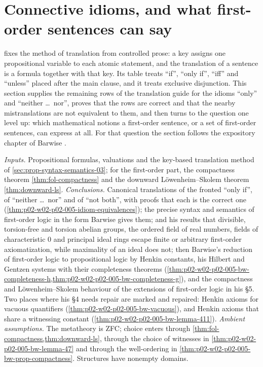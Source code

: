 \section{Connective idioms, and what first-order sentences can say}
\label{sec:p02-w02-p02-005-idioms}

 fixes the method of translation from
controlled prose: a key assigns one propositional variable to each atomic
statement, and the translation of a sentence is a formula together with that
key.  Its table treats ``if'', ``only if'', ``iff'' and ``unless'' placed after
the main clause, and it treats exclusive disjunction.  This section supplies
the remaining rows of the translation guide for the idioms ``only'' and
``neither \dots\ nor'', proves that the rows are correct and that the nearby
mistranslations are not equivalent to them, and then turns to the question
one level up: which mathematical notions a first-order sentence, or a set of
first-order sentences, can express at all.  For that question the section
follows the expository chapter of Barwise \cite[ch.~A.1, pp.~5--46]{Barwise1977FirstOrder}.

\emph{Inputs.}  Propositional formulas, valuations and the key-based
translation method of \cref{sec:prop-syntax-semantics-03}; for the
first-order part, the compactness theorem \cref{thm:fol-compactness} and the
downward L\"owenheim--Skolem theorem \cref{thm:downward-ls}.
\emph{Conclusions.}  Canonical translations of the fronted ``only if'',
of ``neither \dots\ nor'' and of ``not both'', with proofs that each is the
correct one (\cref{thm:p02-w02-p02-005-idiom-equivalences}); the precise
syntax and semantics of first-order logic in the form Barwise gives them;
and his results that divisible, torsion-free and torsion abelian groups,
the ordered field of real numbers, fields of characteristic \(0\) and
principal ideal rings escape finite or arbitrary first-order axiomatization,
while maximality of an ideal does not; then Barwise's reduction of
first-order logic to propositional logic by Henkin constants, his Hilbert
and Gentzen systems with their completeness theorems
(\cref{thm:p02-w02-p02-005-bw-completeness-h,thm:p02-w02-p02-005-bw-completeness-g}),
and the compactness and L\"owenheim--Skolem behaviour of the extensions of
first-order logic in his \S5.  Two places where his \S4 needs repair are
marked and repaired: Henkin axioms for vacuous quantifiers
(\cref{thm:p02-w02-p02-005-bw-vacuous}), and Henkin axioms that share a
witnessing constant (\cref{thm:p02-w02-p02-005-bw-lemma-411}).
\emph{Ambient assumptions.}  The metatheory is ZFC; choice enters through
\cref{thm:fol-compactness,thm:downward-ls}, through the choice of witnesses
in \cref{thm:p02-w02-p02-005-bw-lemma-47} and through the well-ordering in
\cref{thm:p02-w02-p02-005-bw-prop-compactness}.  Structures have nonempty
domains.

